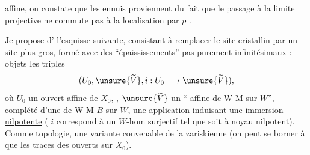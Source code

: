affine, on constate que les ennuis proviennent du fait que le passage à la limite projective ne commute pas à la localisation par $p$
.

Je propose d' l'esquisse suivante, consistant à remplacer le site cristallin par un site plus gros, formé avec des ``épaississements'' pas purement infinitésimaux : objets les triples
\[
(U_0,\unsure{\widetilde V},i:U_0\longrightarrow\unsure{\widetilde V}),
\]
où $U_0$ un ouvert affine de $X_0$, , $\unsure{\widetilde V}$ un `` affine de W-M sur $W$'',  complété d'une  de W-M $\underline B$ sur $W$,
une  application  induisant une \uline{immersion nilpotente}
( $i$ correspond à un $W$-hom surjectif
tel que
soit à noyau nilpotent).
Comme topologie, une variante convenable de la zariskienne (on peut se borner à  que les traces des ouverts sur $X_0$).

